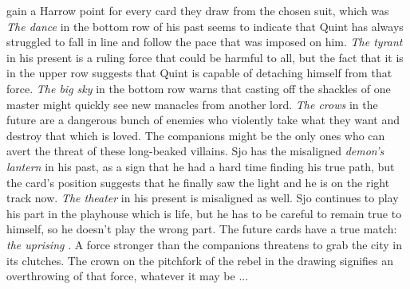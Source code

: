 gain a Harrow point for every card they draw from the chosen suit, which was  {\itshape The dance} in the bottom row of his past seems to indicate that Quint has always struggled to fall in line and follow the pace that was imposed on him.  {\itshape The tyrant} in his present is a ruling force that could be harmful to all, but the fact that it is in the upper row suggests that Quint is capable of detaching himself from that force.  {\itshape The big sky} in the bottom row warns that casting off the shackles of one master might quickly see new manacles from another lord.  {\itshape The crows} in the future are a dangerous bunch of enemies who violently take what they want and destroy that which is loved. The companions might be the only ones who can avert the threat of these long-beaked villains. Sjo has the misaligned {\itshape demon's lantern} in his past, as a sign that he had a hard time finding his true path, but the card's position suggests that he finally saw the light and he is on the right track now.  {\itshape The theater} in his present is misaligned as well. Sjo continues to play his part in the playhouse which is life, but he has to be careful to remain true to himself, so he doesn't play the wrong part. The future cards have a true match:  {\itshape the uprising} . A force stronger than the companions threatens to grab the city in its clutches. The crown on the pitchfork of the rebel in the drawing signifies an overthrowing of that force, whatever it may be ... 